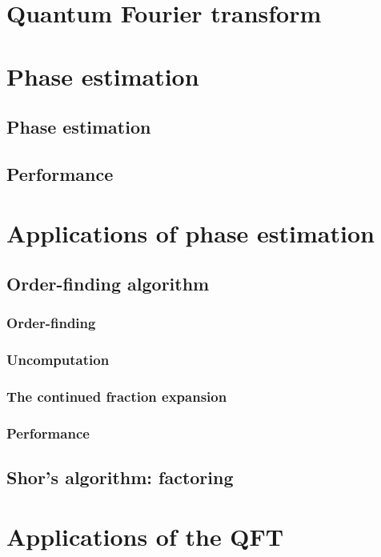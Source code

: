 \section{Quantum Fourier transform}

\section{Phase estimation}
\subsection{Phase estimation}

\subsection{Performance}

\section{Applications of phase estimation}
\subsection{Order-finding algorithm}
\subsubsection{Order-finding}
\subsubsection{Uncomputation}
\subsubsection{The continued fraction expansion}
\subsubsection{Performance}

\subsection{Shor’s algorithm: factoring}


\section{Applications of the QFT}
